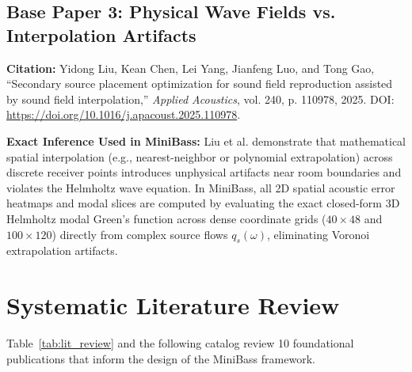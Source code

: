 \documentclass[11pt,a4paper]{article}
\begin{document}
\subsection{Base Paper 3: Physical Wave Fields vs. Interpolation Artifacts}
\noindent \textbf{Citation:} Yidong Liu, Kean Chen, Lei Yang, Jianfeng Luo, and Tong Gao, ``Secondary source placement optimization for sound field reproduction assisted by sound field interpolation,'' \textit{Applied Acoustics}, vol. 240, p. 110978, 2025. DOI: \url{https://doi.org/10.1016/j.apacoust.2025.110978}.

\noindent \textbf{Exact Inference Used in MiniBass:}
Liu et al. demonstrate that mathematical spatial interpolation (e.g., nearest-neighbor or polynomial extrapolation) across discrete receiver points introduces unphysical artifacts near room boundaries and violates the Helmholtz wave equation. 
In MiniBass, all 2D spatial acoustic error heatmaps and modal slices are computed by evaluating the exact closed-form 3D Helmholtz modal Green's function across dense coordinate grids ($40 \times 48$ and $100 \times 120$) directly from complex source flows $q_s(\omega)$, eliminating Voronoi extrapolation artifacts.

\section{Systematic Literature Review}

Table~\ref{tab:lit_review} and the following catalog review 10 foundational publications that inform the design of the MiniBass framework.
\end{document}
